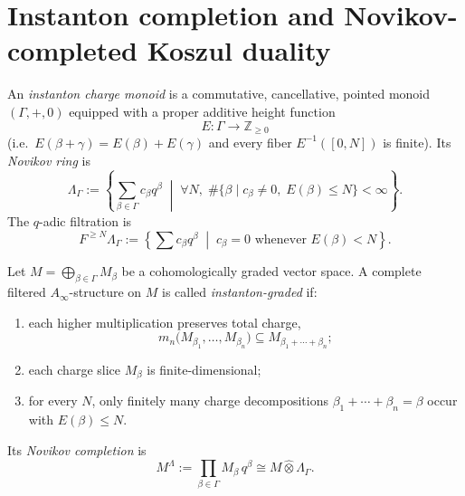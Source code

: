 \section{Instanton completion and Novikov-completed Koszul duality}
\label{sec:instanton-completion-novikov}

\begin{definition}
\label{def:instanton-charge-monoid}
An \emph{instanton charge monoid} is a commutative, cancellative, pointed monoid
$(\Gamma,+,0)$ equipped with a proper additive height function
\[
E\colon \Gamma \longrightarrow \mathbb Z_{\ge 0}
\]
(i.e.\ $E(\beta+\gamma)=E(\beta)+E(\gamma)$ and every fiber $E^{-1}([0,N])$ is finite).
Its \emph{Novikov ring} is
\[
\Lambda_{\Gamma}
:=
\left\{\sum_{\beta\in\Gamma} c_{\beta} q^{\beta}
\;\middle|\;
\forall N,\; \#\{\beta\mid c_{\beta}\neq 0,\;E(\beta)\le N\}<\infty
\right\}.
\]
The $q$-adic filtration is
\[
F^{\ge N}\Lambda_{\Gamma}
:=
\left\{\sum c_{\beta}q^{\beta}\;\middle|\; c_{\beta}=0\text{ whenever }E(\beta)<N\right\}.
\]
\end{definition}

\begin{definition}
\label{def:instanton-graded-homotopy-algebra}
Let $M=\bigoplus_{\beta\in\Gamma} M_{\beta}$ be a cohomologically graded vector space.
A complete filtered $A_{\infty}$-structure on $M$ is called \emph{instanton-graded} if:
\begin{enumerate}[label=(\alph*)]
\item each higher multiplication preserves total charge,
\[
m_n\bigl(M_{\beta_1},\dots,M_{\beta_n}\bigr)
\subseteq M_{\beta_1+\cdots+\beta_n};
\]
\item each charge slice $M_{\beta}$ is finite-dimensional;
\item for every $N$, only finitely many charge decompositions
$\beta_1+\cdots+\beta_n=\beta$ occur with $E(\beta)\le N$.
\end{enumerate}
Its \emph{Novikov completion} is
\[
M^{\Lambda}:=\prod_{\beta\in\Gamma} M_{\beta}\,q^{\beta}
\cong M\widehat\otimes \Lambda_{\Gamma}.
\]
\end{definition}

